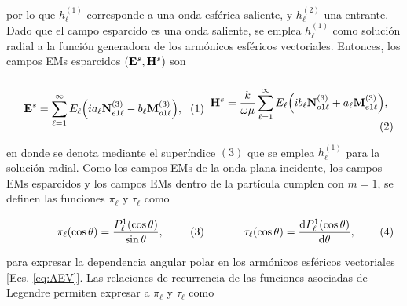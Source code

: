 
\vspace*{-1em}\noindent
por lo que $h_\ell^{(1)}$ corresponde a una onda esférica saliente, y $h_\ell^{(2)}$ una entrante. Dado que el campo esparcido es una onda saliente, se emplea $h_\ell^{(1)}$ como solución radial a la función generadora de los armónicos esféricos vectoriales. Entonces, los campos EMs esparcidos $(\vb{E}^s,\vb{H}^s)$ son 
	\begin{subequations}
	\eqhalf{\vb{E}^s = \sum_{\ell =1}^\infty E_\ell \qty(i a_\ell \vb{N}_{e1\ell}^{(3)}- b_\ell\vb{M}_{o1\ell}^{(3)}),
		\label{eqs:EsAEV}}
	\eqhalf{\vb{H}^s = \frac{k}{\omega\mu} \sum_{\ell =1}^\infty E_\ell\qty(ib_\ell\vb{N}_{o1\ell}^{(3)}+a_\ell\vb{M}_{e1\ell}^{(3)}),
		\label{eqs:HsAEV}}	
	\label{eq:EHsAEV}		
	\end{subequations}
		
\noindent
en donde se denota mediante el superíndice $(3)$ que se emplea $h_\ell^{(1)}$ para la solución radial. Como los campos EMs de la onda plana incidente, los campos EMs esparcidos y los campos EMs dentro de la partícula  cumplen con $m= 1$, se definen las funciones   $\pi_\ell$ y $\tau_\ell$ como  

	\begin{subequations}
	\eqhalf{\pi_\ell(\cos\theta)= \frac{P_\ell^1(\cos\theta)}{\sin\theta},
		\label{eqs:pi}}
	\eqhalf{\tau_\ell(\cos\theta) = \dv{P_\ell^1(\cos\theta)}{\theta},
		\label{eqs:tau}}	
	\label{eq:pitau}		
	\end{subequations}\vspace*{-1em}

\noindent para expresar la dependencia angular polar en los armónicos esféricos vectoriales [Ecs. \eqref{eq:AEV}]. Las relaciones de recurrencia de las funciones asociadas de Legendre \cite{arfken2001methods} permiten expresar a  $\pi_\ell$ y $\tau_\ell$ como  \cite{bohren1998absorption}  

		\vspace*{-1em}

